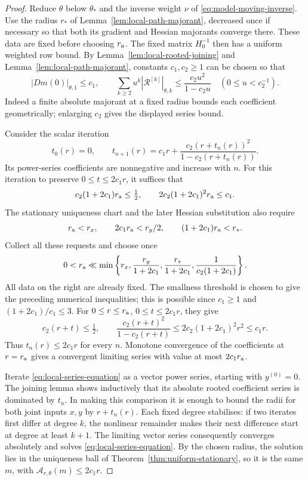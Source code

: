 \documentclass[11pt,reqno]{amsart}
\numberwithin{equation}{section}
\theoremstyle{definition}
\theoremstyle{remark}
\begin{document}
\begin{proof}
Reduce \(\theta\) below \(\theta_*\) and the inverse
weight \(\nu\) of \eqref{eq:model-moving-inverse}.
Use the radius \(r_*\) of Lemma~\ref{lem:local-path-majorant},
decreased once if necessary so that both its gradient and Hessian
majorants converge there. These data are fixed before choosing
\(r_{\rm a}\).
The fixed matrix \(H_0^{-1}\) then has a uniform
weighted row bound. By
Lemma~\ref{lem:local-rooted-joining} and
Lemma~\ref{lem:local-path-majorant}, constants
\(c_1,c_2\ge1\) can be chosen so that
\[
 |Dm(0)|_{\theta,1}\le c_1,\qquad
 \sum_{k\ge2}u^k|\mathcal R^{[k]}|_{\theta,k}
               \le\frac{c_2u^2}{1-c_2u}
                     \quad(0\le u<c_2^{-1}).
\]
Indeed a finite absolute majorant at a fixed radius
bounds each coefficient geometrically; enlarging
\(c_2\) gives the displayed series bound.

Consider the scalar iteration
\begin{equation}
 t_0(r)=0,\qquad
 t_{n+1}(r)=c_1r+
       \frac{c_2(r+t_n(r))^2}{1-c_2(r+t_n(r))}.
 \label{eq:local-scalar-majorant}
\end{equation}
Its power-series coefficients are nonnegative and
increase with \(n\).
For this iteration to preserve \(0\le t\le2c_1r\), it suffices that
\[
 c_2(1+2c_1)r_{\rm a}\le\tfrac12,\qquad
 2c_2(1+2c_1)^2r_{\rm a}\le c_1.
\]
The stationary uniqueness chart and the later Hessian substitution
also require
\[
 r_{\rm a}<r_x,\qquad 2c_1r_{\rm a}<r_y/2,\qquad
                         (1+2c_1)r_{\rm a}<r_*.
\]
Collect all these requests and choose once
\[
 0<r_{\rm a}\ll
 \min\left\{r_x,\frac{r_y}{1+2c_1},
          \frac{r_*}{1+2c_1},\frac1{c_2(1+2c_1)}\right\}.
\]
All data on the right are already fixed. The smallness threshold
is chosen to give the preceding numerical inequalities; this is
possible since \(c_1\ge1\) and \((1+2c_1)/c_1\le3\).
For \(0\le r\le r_{\rm a}\), \(0\le t\le2c_1r\), they give
\[
 c_2(r+t)\le\tfrac12,\qquad
 \frac{c_2(r+t)^2}{1-c_2(r+t)}
 \le2c_2(1+2c_1)^2r^2\le c_1r.
\]
Thus \(t_n(r)\le2c_1r\) for every \(n\).
Monotone convergence of the coefficients at
\(r=r_{\rm a}\) gives a convergent limiting series
with value at most \(2c_1r_{\rm a}\).

Iterate \eqref{eq:local-series-equation} as a vector
power series, starting with \(y^{(0)}=0\).
The joining lemma shows inductively that its
absolute rooted coefficient series is dominated
by \(t_n\). In making this comparison it is enough
to bound the radii for both joint inputs \(x,y\)
by \(r+t_n(r)\).
Each fixed degree stabilises: if two iterates
first differ at degree \(k\), the nonlinear
remainder makes their next difference start at
degree at least \(k+1\).
The limiting vector series consequently converges
absolutely and solves \eqref{eq:local-series-equation}.
By the chosen radius, the solution lies in the uniqueness ball of
Theorem~\ref{thm:uniform-stationary}, so it is the
same \(m\), with
\(\mathcal A_{r,\theta}(m)\le2c_1r\).


\end{proof}
\end{document}
